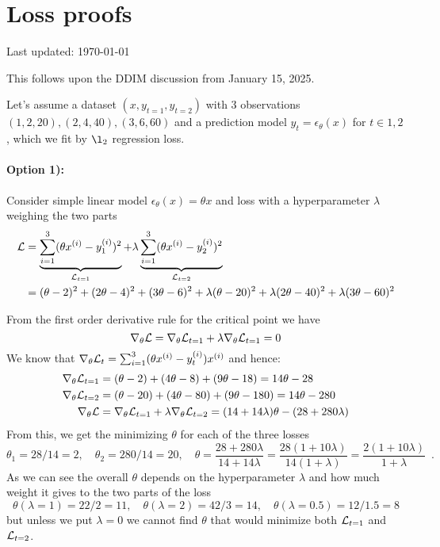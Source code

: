 \clearpage

\section{Loss proofs}\label{sec:loss_proofs}

\begin{flushright}
Last updated: \today
\end{flushright}

This follows upon the DDIM discussion from January 15, 2025.

Let's assume a dataset $(x, y_{t=1}, y_{t=2})$ with 3 observations $(1, 2, 20), (2, 4, 40), (3, 6, 60)$ and a prediction model $y_{t} = \epsilon_{\theta}(x)$ for $t \in {1,2}$, which we fit by $\l_2$ regression loss.

\paragraph{Option 1):}
Consider simple linear model $\epsilon_{\theta}(x) = \theta x$ and loss with a hyperparameter $\lambda$ weighing the two parts
\begin{align}
\mathcal{L}  & =  \underbrace{\sum_{i=1}^3 (\theta x^{(i)} - y^{(i)}_1)^2}_{\mathcal{L}_{t=1}} + \lambda \underbrace{\sum_{i=1}^3 (\theta x^{(i)} - y^{(i)}_2)^2}_{\mathcal{L}_{t=2}} \\
& = (\theta - 2)^2 + (2 \theta - 4)^2 + (3 \theta - 6)^2 
 + \lambda (\theta - 20)^2 + \lambda (2 \theta - 40)^2 + \lambda (3 \theta - 60)^2
\end{align}

From the first order derivative rule for the critical point we have
\begin{equation}
\nabla_{\theta} \mathcal{L} = \nabla_{\theta} \mathcal{L}_{t=1} + \lambda \nabla_{\theta} \mathcal{L}_{t=1} = 0
\end{equation}
We know that $\nabla_{\theta} \mathcal{L}_{t} = \sum_{i=1}^3 (\theta x^{(i)} - y^{(i)}_t) x^{(i)}$ and hence:
\begin{align}
\nabla_{\theta} \mathcal{L}_{t=1} & = (\theta - 2) + (4 \theta - 8) + (9 \theta - 18) = 14 \theta - 28 \nonumber \\
\nabla_{\theta} \mathcal{L}_{t=2} & = (\theta - 20) + (4 \theta - 80) + (9 \theta - 180) = 14 \theta - 280 \nonumber \\
\nabla_{\theta} \mathcal{L} & = \nabla_{\theta} \mathcal{L}_{t=1} + \lambda \nabla_{\theta} \mathcal{L}_{t=2} = (14+14\lambda) \theta - (28 + 280 \lambda)
\end{align}
From this, we get the minimizing $\theta$ for each of the three losses
\begin{equation}
\theta_{1} = 28/14 = 2, \quad \theta_2 = 280/14 = 20, \quad \theta = \frac{28 + 280 \lambda}{14+14\lambda} = \frac{28 (1 + 10 \lambda)}{14 (1+\lambda)} =  \frac{2 (1 + 10 \lambda)}{1+\lambda} \enspace .
\end{equation}
As we can see the overall $\theta$ depends on the hyperparameter $\lambda$ and how much weight it gives to the two parts of the loss
\begin{equation}
\theta(\lambda = 1) = 22/2 = 11, \quad \theta(\lambda = 2) = 42/3 = 14, \quad \theta(\lambda = 0.5) = 12/1.5 = 8 
\end{equation}
but unless we put $\lambda = 0$ we cannot find $\theta$ that would minimize both $\mathcal{L}_{t=1}$ and $\mathcal{L}_{t=2}$.

